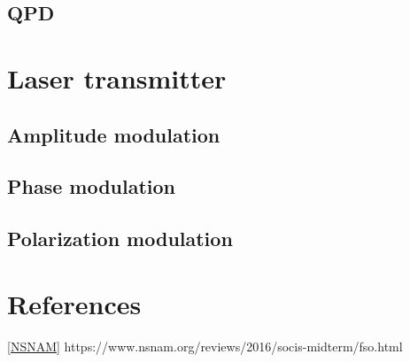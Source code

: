 \documentclass[a4paper]{article}
\begin{document}
\subsection{QPD}

\section{Laser transmitter}
\subsection{Amplitude modulation}
\subsection{Phase modulation}
\subsection{Polarization modulation}


\section{References}
\ref{NSNAM}
https://www.nsnam.org/reviews/2016/socis-midterm/fso.html
\end{document}
